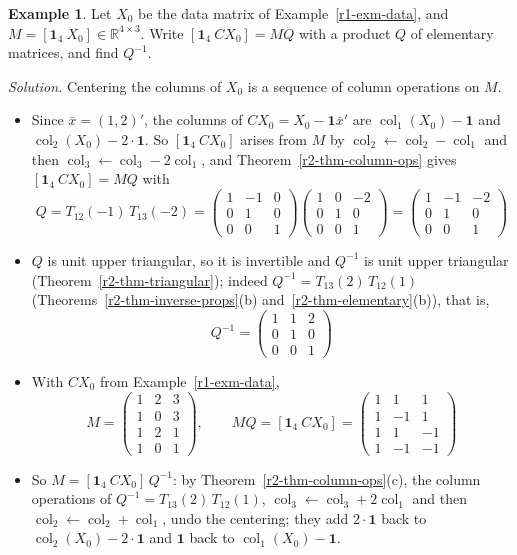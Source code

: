 \documentclass[12pt]{article}
\newcommand{\R}{\mathbb R}
\newcommand{\one}{\mathbf 1}
\DeclareMathOperator{\col}{col}
\theoremstyle{definition}
\newtheorem{example}[theorem]{Example}
\begin{document}
\begin{example}\label{r2-exm-centering}
Let \(X_0\) be the data matrix of Example~\ref{r1-exm-data}, and \(M=[\one_4\ X_0]\in\R^{4\times3}\). Write
\([\one_4\ CX_0]=MQ\) with a product \(Q\) of elementary matrices, and find \(Q^{-1}\).

\textit{Solution.} Centering the columns of \(X_0\) is a sequence of column operations on \(M\).
\begin{itemize}
\item Since \(\bar x=(1,2)'\), the columns of \(CX_0=X_0-\one\bar x'\) are \(\col_1(X_0)-\one\) and
\(\col_2(X_0)-2\cdot\one\). So \([\one_4\ CX_0]\) arises from \(M\) by \(\col_2\leftarrow\col_2-\col_1\) and then
\(\col_3\leftarrow\col_3-2\col_1\), and Theorem~\ref{r2-thm-column-ops} gives \([\one_4\ CX_0]=MQ\) with
\[
Q=T_{12}(-1)\,T_{13}(-2)=\begin{pmatrix}1&-1&0\\0&1&0\\0&0&1\end{pmatrix}\begin{pmatrix}1&0&-2\\0&1&0\\0&0&1\end{pmatrix}
=\begin{pmatrix}1&-1&-2\\0&1&0\\0&0&1\end{pmatrix}
\]
\item \(Q\) is unit upper triangular, so it is invertible and \(Q^{-1}\) is unit upper triangular
(Theorem~\ref{r2-thm-triangular}); indeed \(Q^{-1}=T_{13}(2)\,T_{12}(1)\) (Theorems~\ref{r2-thm-inverse-props}(b)
and~\ref{r2-thm-elementary}(b)), that is,
\[
Q^{-1}=\begin{pmatrix}1&1&2\\0&1&0\\0&0&1\end{pmatrix}
\]
\item With \(CX_0\) from Example~\ref{r1-exm-data},
\[
M=\begin{pmatrix}1&2&3\\1&0&3\\1&2&1\\1&0&1\end{pmatrix},\qquad
MQ=[\one_4\ CX_0]=\begin{pmatrix}1&1&1\\1&-1&1\\1&1&-1\\1&-1&-1\end{pmatrix}
\]
\item So \(M=[\one_4\ CX_0]\,Q^{-1}\): by Theorem~\ref{r2-thm-column-ops}(c), the column operations of
\(Q^{-1}=T_{13}(2)\,T_{12}(1)\), \(\col_3\leftarrow\col_3+2\col_1\) and then \(\col_2\leftarrow\col_2+\col_1\), undo
the centering; they add \(2\cdot\one\) back to \(\col_2(X_0)-2\cdot\one\) and \(\one\) back to \(\col_1(X_0)-\one\).
\end{itemize}
\end{example}
\end{document}
